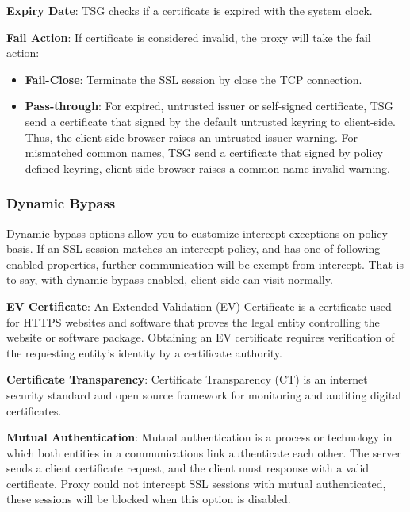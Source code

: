 \textbf{Expiry Date}: TSG checks if a certificate is expired with the system clock.


\textbf{Fail Action}: If certificate is considered invalid, the proxy will take the fail action:

\begin{itemize}
    \item \textbf{Fail-Close}: Terminate the SSL session by close the TCP connection.
    \item \textbf{Pass-through}: For expired, untrusted issuer or self-signed certificate, TSG send a certificate that signed by the default untrusted keyring to client-side. Thus, the client-side browser raises an untrusted issuer warning. For mismatched common names, TSG send a certificate that signed by policy defined keyring, client-side browser raises a common name invalid warning.
\end{itemize}

\subsubsection*{\hypertarget{link:Dynamic Bypass}{Dynamic Bypass}}
\label{sec:decrypt:profile:decryptionprofile:bypass}

Dynamic bypass options allow you to customize intercept exceptions on policy basis. If an SSL session matches an intercept policy, and has one of following enabled properties, further communication will be exempt from intercept. That is to say, with dynamic bypass enabled, client-side can visit normally.


\textbf{EV Certificate}: An Extended Validation (EV) Certificate is a certificate used for HTTPS websites and software that proves the legal entity controlling the website or software package. Obtaining an EV certificate requires verification of the requesting entity's identity by a certificate authority.


\textbf{Certificate Transparency}: Certificate Transparency (CT) is an internet security standard and open source framework for monitoring and auditing digital certificates.


\textbf{Mutual Authentication}: Mutual authentication is a process or technology in which both entities in a communications link authenticate each other. The server sends a client certificate request, and the client must response with a valid certificate. Proxy could not intercept SSL sessions with mutual authenticated, these sessions will be blocked when this option is disabled.


